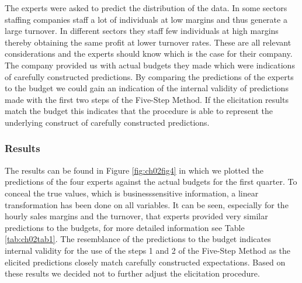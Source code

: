\documentclass[openright,titlepage,12pt,a4paper]{book}
\begin{document}
The experts were asked to predict the distribution of the data. In some sectors staffing companies staff a lot of individuals at low margins and thus generate a large turnover. In different sectors they staff few individuals at high margins thereby obtaining the same profit at lower turnover rates. These are all relevant considerations and the experts should know which is the case for their company. The company provided us with actual budgets they made which were indications of carefully constructed predictions. By comparing the predictions of the experts to the budget we could gain an indication of the internal validity of predictions made with the first two steps of the Five-Step Method. If the elicitation results match the budget this indicates that the procedure is able to represent the underlying construct of carefully constructed predictions.

\hypertarget{results-1}{%
\subsubsection{Results}\label{results-1}}

The results can be found in Figure \ref{fig:ch02fig4} in which we plotted the predictions of the four experts against the actual budgets for the first quarter. To conceal the true values, which is businesssensitive information, a linear transformation has been done on all variables. It can be seen, especially for the hourly sales margins and the turnover, that experts provided very similar predictions to the budgets, for more detailed information see Table \ref{tab:ch02tab1}. The resemblance of the predictions to the budget indicates internal validity for the use of the steps 1 and 2 of the Five-Step Method as the elicited predictions closely match carefully constructed expectations. Based on these results we decided not to further adjust the elicitation procedure.
\end{document}

